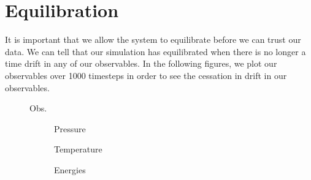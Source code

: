 \section{Equilibration}
It is important that we allow the system to equilibrate before we can trust our data. We can tell that our simulation has equilibrated when there is no longer a time drift in any of our observables. In the following figures, we plot our observables over 1000 timesteps in order to see the cessation in drift in our observables.

\begin{figure}[ht]
Obs.
\hfill
\begin{subfigure}{0.3\textwidth}
\centering
Pressure
\end{subfigure}
\hfill
\begin{subfigure}{0.3\textwidth}
\centering
Temperature
\end{subfigure}
\hfill
\begin{subfigure}{0.3\textwidth}
\centering
Energies
\end{subfigure}


\end{figure}
